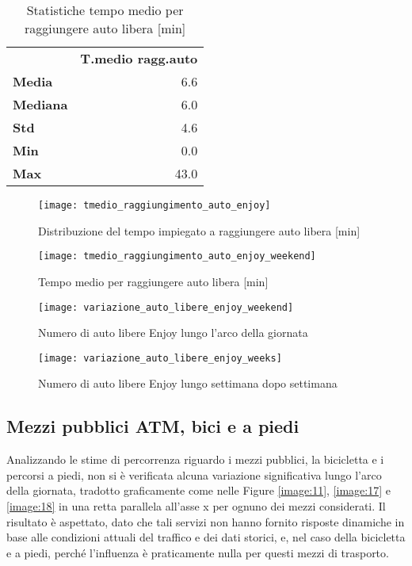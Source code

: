 \begin{table}[H]
	\centering
	\begin{tabular}{ | l r | }
		\hline
		& \textbf{T.medio ragg.auto} \\
		\textbf{Media}   &  6.6 \\
		\textbf{Mediana} &  6.0 \\
		\textbf{Std}     &  4.6 \\
		\textbf{Min}     &  0.0 \\ 
		\textbf{Max}     & 43.0 \\
		\hline
	\end{tabular}
	\caption{Statistiche tempo medio per raggiungere auto libera [min]}
	\label{table:4}
\end{table}

\begin{figure}[H]
	\centering
	\texttt{[image: tmedio\_raggiungimento\_auto\_enjoy]}
	\caption{Distribuzione del tempo impiegato a raggiungere auto libera [min]}
	\label{image:8}
\end{figure}

\begin{figure}
	\centering
	\texttt{[image: tmedio\_raggiungimento\_auto\_enjoy\_weekend]}
	\caption{Tempo medio per raggiungere auto libera [min]}
	\label{image:21}
\end{figure}

\begin{figure}
	\centering
	\texttt{[image: variazione\_auto\_libere\_enjoy\_weekend]}
	\caption{Numero di auto libere Enjoy lungo l'arco della giornata}
	\label{image:9}
\end{figure}

\begin{figure}
\centering
\texttt{[image: variazione\_auto\_libere\_enjoy\_weeks]}
\caption{Numero di auto libere Enjoy lungo settimana dopo settimana}
\label{image:10}
\end{figure}

\pagebreak

\subsection{Mezzi pubblici ATM, bici e a piedi}

Analizzando le stime di percorrenza riguardo i mezzi pubblici, la bicicletta e i percorsi a piedi, non si è verificata alcuna variazione significativa lungo l'arco della giornata, tradotto graficamente come nelle Figure \ref{image:11}, \ref{image:17} e \ref{image:18} in una retta parallela all'asse x per ognuno dei mezzi considerati. Il risultato è aspettato, dato che tali servizi non hanno fornito risposte dinamiche in base alle condizioni attuali del traffico e dei dati storici, e, nel caso della bicicletta e a piedi, perché l'influenza è praticamente nulla per questi mezzi di trasporto.


